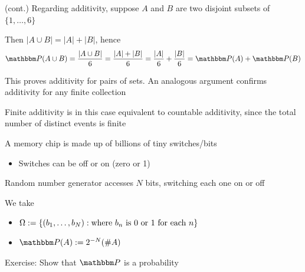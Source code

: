 \begin{frame}
    
    \vspace{2em}
    \Eg (cont.)
    Regarding additivity,
    suppose $A$ and $B$ are two disjoint subsets of $\{1,\ldots, 6\}$
    
    Then $|A \cup B| = |A| + |B|$, hence
    \begin{equation*}
        \PP(A \cup B) 
         = \frac{|A \cup B|}{6} 
         = \frac{|A| + |B|} {6}
         = \frac{|A|}{6} + \frac{|B|}{6}
         = \PP(A) + \PP(B)
    \end{equation*}


    This proves additivity for pairs of sets.  An analogous argument confirms
    additivity for any finite collection
    
    Finite additivity is in this case equivalent to countable additivity,
    since the total number of distinct events is finite
    
\end{frame}

\begin{frame}

    \vspace{2em}
    \begin{example}
        A memory chip is made up of billions of tiny switches/bits

        \begin{itemize}
            \item Switches can be off or on (zero or 1)
        \end{itemize}
        
        Random number generator accesses $N$ bits, switching each one on or
        off

        We take 
        \begin{itemize}
            \item $\Omega := \{  (b_1,\ldots, b_N)  :  \text{where } b_n
                \text{ is 0 or 1 for each } n \}$
            \item $\PP(A) := 2^{-N} (\# A)$
        \end{itemize}
        
        Exercise: Show that $\PP$ is a probability
        
    \end{example}

\end{frame}



